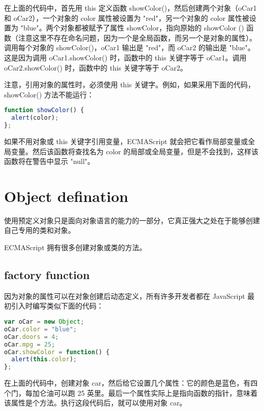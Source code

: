 在上面的代码中，首先用 this 定义函数 showColor()，然后创建两个对象（oCar1 和 oCar2），一个对象的 color 属性被设置为 "red"，另一个对象的 color 属性被设置为 "blue"。两个对象都被赋予了属性 showColor，指向原始的 showColor () 函数（注意这里不存在命名问题，因为一个是全局函数，而另一个是对象的属性）。调用每个对象的 showColor()，oCar1 输出是 "red"，而 oCar2 的输出是 "blue"。这是因为调用 oCar1.showColor() 时，函数中的 this 关键字等于 oCar1。调用 oCar2.showColor() 时，函数中的 this 关键字等于 oCar2。


注意，引用对象的属性时，必须使用 this 关键字。例如，如果采用下面的代码，showColor() 方法不能运行：

\begin{lstlisting}[language=JavaScript]
function showColor() {
  alert(color);
};
\end{lstlisting}

如果不用对象或 this 关键字引用变量，ECMAScript 就会把它看作局部变量或全局变量。然后该函数将查找名为 color 的局部或全局变量，但是不会找到，这样该函数将在警告中显示 "null"。



\chapter{Object defination}


使用预定义对象只是面向对象语言的能力的一部分，它真正强大之处在于能够创建自己专用的类和对象。



ECMAScript 拥有很多创建对象或类的方法。





\section{factory function}


因为对象的属性可以在对象创建后动态定义，所有许多开发者都在 JavaScript 最初引入时编写类似下面的代码：

\begin{lstlisting}[language=JavaScript]
var oCar = new Object;
oCar.color = "blue";
oCar.doors = 4;
oCar.mpg = 25;
oCar.showColor = function() {
  alert(this.color);
};
\end{lstlisting}

在上面的代码中，创建对象 car，然后给它设置几个属性：它的颜色是蓝色，有四个门，每加仑油可以跑 25 英里。最后一个属性实际上是指向函数的指针，意味着该属性是个方法。执行这段代码后，就可以使用对象 car。

